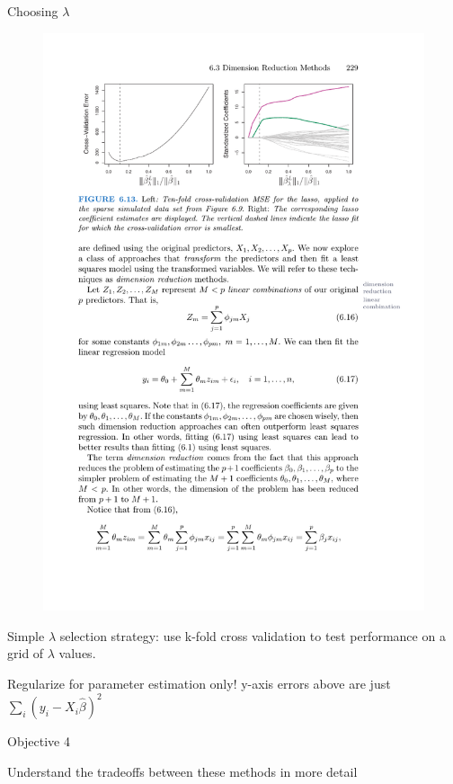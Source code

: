 \documentclass[mathserif, aspectratio=169]{beamer}
\begin{document}
\begin{frame}{Choosing $\lambda$}
\begin{figure}
\includegraphics[scale=.85]{lasso-tenfold}
\end{figure}

\pause

Simple $\lambda$ selection strategy: use k-fold cross validation to test performance on a grid of $\lambda$ values. 

\vspace{5mm}

Regularize for parameter estimation only!  y-axis errors above are just $\sum_i (y_i-X_i\hat{\beta})^2$

\end{frame}

\begin{frame}{Objective 4}

Understand the tradeoffs between these methods in more detail

\end{frame}
\end{document}
